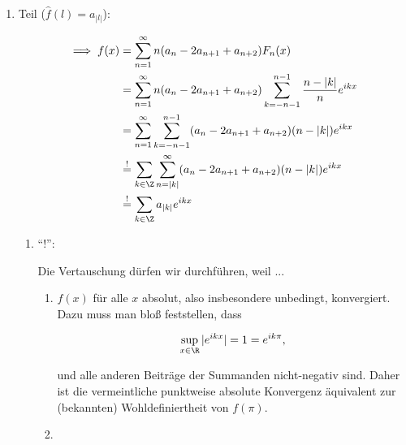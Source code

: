 \begin{solution}
\begin{enumerate}[label = \arabic*.]
    \item Teil ($\hat f(l) = a_{|l|}$):
    

    \begin{align*}
        \implies
        f(x)
        & =
        \sum_{n=1}^\infty
        n (a_n - 2 a_{n+1} + a_{n+2})
        F_n(x) \\
        & =
        \sum_{n=1}^\infty
        n (a_n - 2 a_{n+1} + a_{n+2})
        \sum_{k = -n-1}^{n-1}
        \frac{n - |k|}{n}
        e^{i k x} \\
        & =
        \sum_{n=1}^\infty
        \sum_{k = -n-1}^{n-1}
        (a_n - 2 a_{n+1} + a_{n+2})
        (n - |k|)
        e^{i k x} \\
        & \stackrel{!}{=}
        \sum_{k \in \Z}
        \sum_{n = |k|}^\infty
        (a_n - 2 a_{n+1} + a_{n+2})
        (n - |k|)
        e^{i k x} \\
        & \stackrel{!}{=}
        \sum_{k \in \Z}
        a_{|k|}
        e^{i k x}
    \end{align*}

    \begin{enumerate}[label = \arabic*.]

        \item \enquote{!}:

        Die Vertauschung dürfen wir durchführen, weil ...

        \begin{enumerate}[label = \arabic*.]
    
            \item $f(x)$ für alle $x$ absolut, also insbesondere unbedingt, konvergiert.
            Dazu muss man bloß feststellen, dass
    
            \begin{align*}
                \sup_{x \in \R} |e^{i k x}|
                =
                1
                =
                e^{i k \pi},
            \end{align*}
    
            und alle anderen Beiträge der Summanden nicht-negativ sind.
            Daher ist die vermeintliche punktweise absolute Konvergenz äquivalent zur (bekannten) Wohldefiniertheit von $f(\pi)$.
    
            \item \phantom{}
    

\end{enumerate}
\end{enumerate}
\end{enumerate}
\end{solution}
